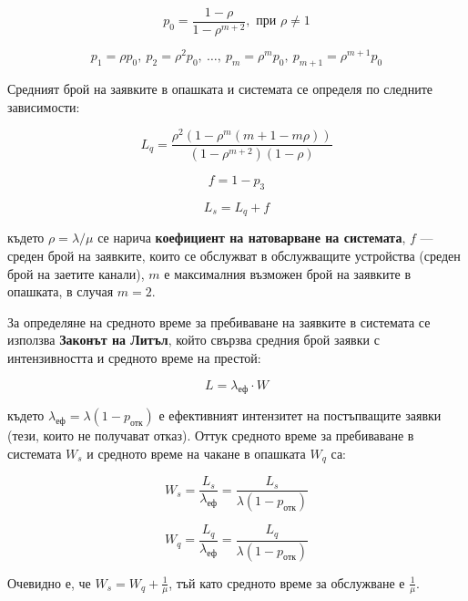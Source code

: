 	\begin{equation}
		p_0 = \frac{1 - \rho}{1 - \rho^{m+2}}, \text{ при } \rho \neq 1 \tag{6.12}
	\end{equation}
	
	\begin{equation}
		p_1 = \rho p_0, \ p_2 = \rho^2 p_0, \ \dots, \ p_m = \rho^m p_0, \ p_{m+1} = \rho^{m+1} p_0 \tag{6.13}
	\end{equation}
	
	Средният брой на заявките в опашката и системата се определя по следните зависимости:
	
	\begin{equation}
		L_q = \frac{\rho^2 (1 - \rho^m (m+1-m\rho))}{(1 - \rho^{m+2})(1 - \rho)} \tag{6.14}
	\end{equation}
	
	\begin{equation}
		f = 1 - p_3 \tag{6.15}
	\end{equation}
	
	\begin{equation}
		L_s = L_q + f \tag{6.16}
	\end{equation}
	
	\noindent където $\rho = \lambda / \mu$ се нарича \textbf{коефициент на натоварване на системата}, $f$ — среден брой на заявките, които се обслужват в обслужващите устройства (среден брой на заетите канали), $m$ е максималния възможен брой на заявките в опашката, в случая $m=2$.
	
	За определяне на средното време за пребиваване на заявките в системата се използва \textbf{Законът на Литъл}, който свързва средния брой заявки с интензивността и средното време на престой:

\begin{equation}
	L = \lambda_{\text{еф}} \cdot W \tag{6.17}
\end{equation}

\noindent където $\lambda_{\text{еф}} = \lambda (1 - p_{\text{отк}})$ е ефективният интензитет на постъпващите заявки (тези, които не получават отказ). Оттук средното време за пребиваване в системата $W_s$ и средното време на чакане в опашката $W_q$ са:

\begin{equation}
	W_s = \frac{L_s}{\lambda_{\text{еф}}} = \frac{L_s}{\lambda (1 - p_{\text{отк}})} \tag{6.18}
\end{equation}

\begin{equation}
	W_q = \frac{L_q}{\lambda_{\text{еф}}} = \frac{L_q}{\lambda (1 - p_{\text{отк}})} \tag{6.19}
\end{equation}

\noindent Очевидно е, че $W_s = W_q + \frac{1}{\mu}$, тъй като средното време за обслужване е $\frac{1}{\mu}$.
	